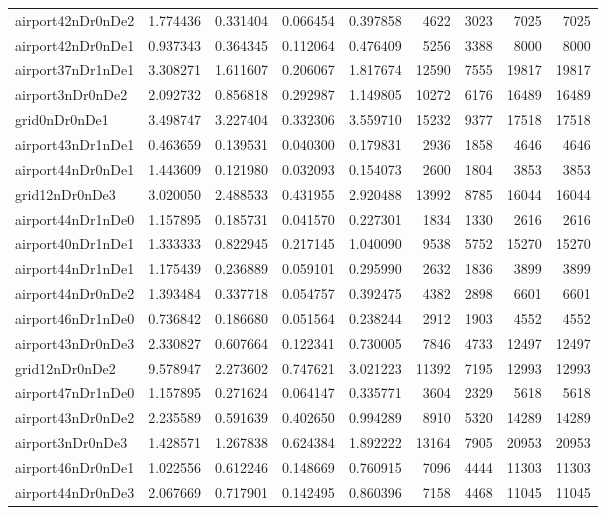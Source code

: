 \begin{longtable}{|l|r|r|r|r|r|r|r|r|}
airport42nDr0nDe2 & 1.774436 & 0.331404 & 0.066454 & 0.397858 & 4622 & 3023 & 7025 & 7025 \\
airport42nDr0nDe1 & 0.937343 & 0.364345 & 0.112064 & 0.476409 & 5256 & 3388 & 8000 & 8000 \\
airport37nDr1nDe1 & 3.308271 & 1.611607 & 0.206067 & 1.817674 & 12590 & 7555 & 19817 & 19817 \\
airport3nDr0nDe2 & 2.092732 & 0.856818 & 0.292987 & 1.149805 & 10272 & 6176 & 16489 & 16489 \\
grid0nDr0nDe1 & 3.498747 & 3.227404 & 0.332306 & 3.559710 & 15232 & 9377 & 17518 & 17518 \\
airport43nDr1nDe1 & 0.463659 & 0.139531 & 0.040300 & 0.179831 & 2936 & 1858 & 4646 & 4646 \\
airport44nDr0nDe1 & 1.443609 & 0.121980 & 0.032093 & 0.154073 & 2600 & 1804 & 3853 & 3853 \\
grid12nDr0nDe3 & 3.020050 & 2.488533 & 0.431955 & 2.920488 & 13992 & 8785 & 16044 & 16044 \\
airport44nDr1nDe0 & 1.157895 & 0.185731 & 0.041570 & 0.227301 & 1834 & 1330 & 2616 & 2616 \\
airport40nDr1nDe1 & 1.333333 & 0.822945 & 0.217145 & 1.040090 & 9538 & 5752 & 15270 & 15270 \\
airport44nDr1nDe1 & 1.175439 & 0.236889 & 0.059101 & 0.295990 & 2632 & 1836 & 3899 & 3899 \\
airport44nDr0nDe2 & 1.393484 & 0.337718 & 0.054757 & 0.392475 & 4382 & 2898 & 6601 & 6601 \\
airport46nDr1nDe0 & 0.736842 & 0.186680 & 0.051564 & 0.238244 & 2912 & 1903 & 4552 & 4552 \\
airport43nDr0nDe3 & 2.330827 & 0.607664 & 0.122341 & 0.730005 & 7846 & 4733 & 12497 & 12497 \\
grid12nDr0nDe2 & 9.578947 & 2.273602 & 0.747621 & 3.021223 & 11392 & 7195 & 12993 & 12993 \\
airport47nDr1nDe0 & 1.157895 & 0.271624 & 0.064147 & 0.335771 & 3604 & 2329 & 5618 & 5618 \\
airport43nDr0nDe2 & 2.235589 & 0.591639 & 0.402650 & 0.994289 & 8910 & 5320 & 14289 & 14289 \\
airport3nDr0nDe3 & 1.428571 & 1.267838 & 0.624384 & 1.892222 & 13164 & 7905 & 20953 & 20953 \\
airport46nDr0nDe1 & 1.022556 & 0.612246 & 0.148669 & 0.760915 & 7096 & 4444 & 11303 & 11303 \\
airport44nDr0nDe3 & 2.067669 & 0.717901 & 0.142495 & 0.860396 & 7158 & 4468 & 11045 & 11045 \\

\end{longtable}
